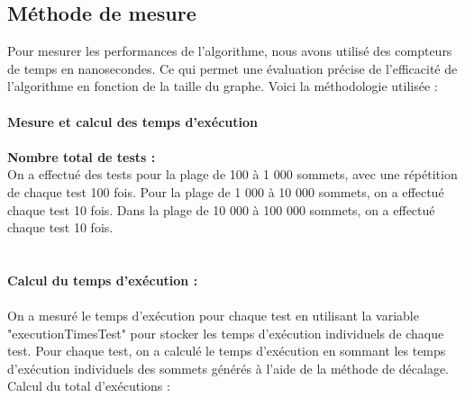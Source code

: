 \documentclass[hidelinks,letterpaper,12pt]{article}
\begin{document}
\subsection{Méthode de mesure} 
Pour mesurer les performances de l'algorithme, nous avons utilisé des compteurs de temps en nanosecondes. Ce qui permet une évaluation précise de l'efficacité de l'algorithme en fonction de la taille du graphe. Voici la méthodologie utilisée :
\\ \\
\textbf{Mesure et calcul des temps d'exécution}
\\ \\
\textbf{Nombre total de tests :}
\\
On a effectué des tests pour la plage de 100 à 1 000 sommets, avec une répétition de chaque test 100 fois.
Pour la plage de 1 000 à 10 000 sommets, on a effectué chaque test 10 fois.
Dans la plage de 10 000 à 100 000 sommets, on a effectué chaque test 10 fois.
\\ \\ \\
\textbf{Calcul du temps d'exécution :}
\\ \\
On a mesuré le temps d'exécution pour chaque test en utilisant la variable "executionTimesTest" pour stocker les temps d'exécution individuels de chaque test.
Pour chaque test, on a calculé le temps d'exécution en sommant les temps d'exécution individuels des sommets générés à l'aide de la méthode de décalage.
Calcul du total d'exécutions :
\end{document}
